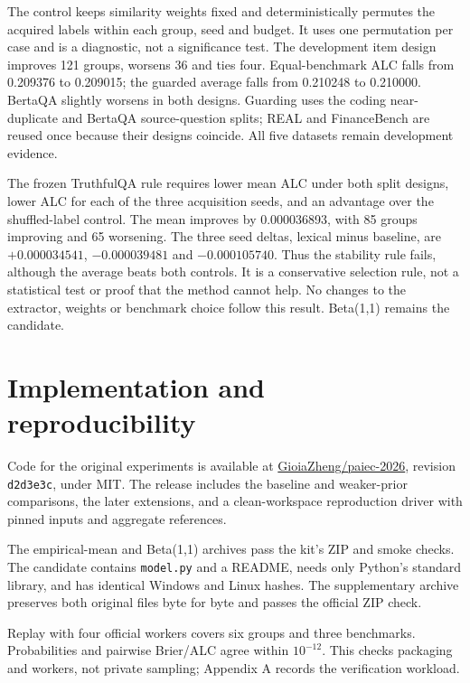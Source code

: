 \documentclass{article}
\begin{document}
The control keeps similarity weights fixed and deterministically permutes the acquired labels within each group, seed and budget. It uses one permutation per case and is a diagnostic, not a significance test. The development item design improves 121 groups, worsens 36 and ties four. Equal-benchmark ALC falls from 0.209376 to 0.209015; the guarded average falls from 0.210248 to 0.210000. BertaQA slightly worsens in both designs. Guarding uses the coding near-duplicate and BertaQA source-question splits; REAL and FinanceBench are reused once because their designs coincide. All five datasets remain development evidence.

The frozen TruthfulQA rule requires lower mean ALC under both split designs, lower ALC for each of the three acquisition seeds, and an advantage over the shuffled-label control. The mean improves by 0.000036893, with 85 groups improving and 65 worsening. The three seed deltas, lexical minus baseline, are \(+0.000034541\), \(-0.000039481\) and \(-0.000105740\). Thus the stability rule fails, although the average beats both controls. It is a conservative selection rule, not a statistical test or proof that the method cannot help. No changes to the extractor, weights or benchmark choice follow this result. Beta(1,1) remains the candidate.

\section{Implementation and reproducibility}\label{implementation-and-reproducibility}

Code for the original experiments is available at \href{https://github.com/GioiaZheng/paiec-2026/tree/d2d3e3c1e803880f4918f2f8065616b513731a40}{GioiaZheng/paiec-2026}, revision \texttt{d2d3e3c}, under MIT. The release includes the baseline and weaker-prior comparisons, the later extensions, and a clean-workspace reproduction driver with pinned inputs and aggregate references.

The empirical-mean and Beta(1,1) archives pass the kit's ZIP and smoke checks. The candidate contains \texttt{model.py} and a README, needs only Python's standard library, and has identical Windows and Linux hashes. The supplementary archive preserves both original files byte for byte and passes the official ZIP check.

Replay with four official workers covers six groups and three benchmarks. Probabilities and pairwise Brier/ALC agree within \(10^{-12}\). This checks packaging and workers, not private sampling; Appendix A records the verification workload.
\end{document}
